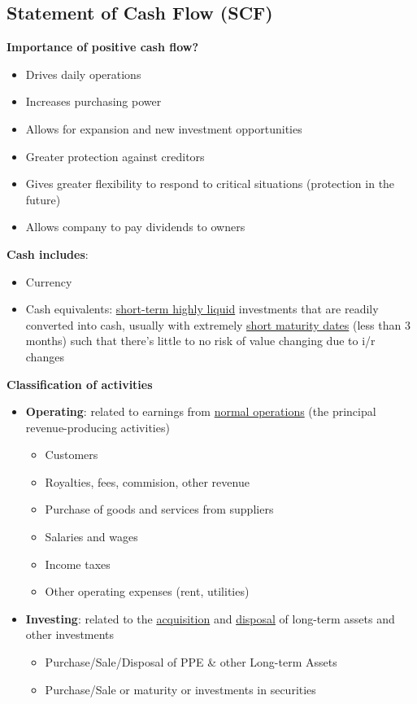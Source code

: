 \documentclass{article}
\begin{document}
\begin{multicols}{2}
\section{Statement of Cash Flow (SCF)}
\textbf{Importance of positive cash flow?}
\begin{itemize}
	\item Drives daily operations
	\item Increases purchasing power
	\item Allows for expansion and new investment opportunities
	\item Greater protection against creditors
	\item Gives greater flexibility to respond to critical situations (protection in the future)
	\item Allows company to pay dividends to owners
\end{itemize}
\textbf{Cash includes}:
\begin{itemize}
	\item Currency
	\item Cash equivalents: \underline{short-term highly liquid} investments that are readily converted into cash, usually with extremely \underline{short maturity dates} (less than 3 months) such that there's little to no risk of value changing due to i/r changes
\end{itemize}
\textbf{Classification of activities}
\begin{itemize}
	\item \textbf{Operating}: related to earnings from \underline{normal operations} (the principal revenue-producing activities)
	\begin{itemize}
		\item Customers
		\item Royalties, fees, commision, other revenue
		\item Purchase of goods and services from suppliers
		\item Salaries and wages
		\item Income taxes
		\item Other operating expenses (rent, utilities)
	\end{itemize}
	\item \textbf{Investing}: related to the \underline{acquisition} and \underline{disposal} of long-term assets and other investments
	\begin{itemize}
		\item Purchase/Sale/Disposal of PPE \& other Long-term Assets
		\item Purchase/Sale or maturity or investments in securities

\end{itemize}
\end{itemize}
\end{multicols}
\end{document}
